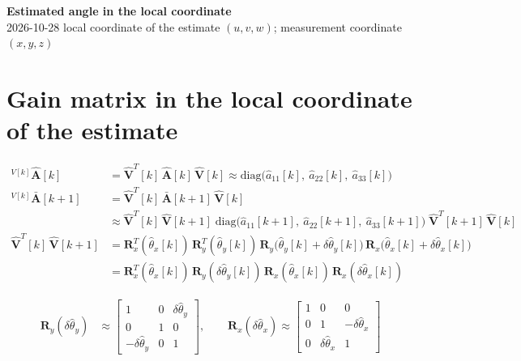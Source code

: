 \documentclass[11pt,a4paper]{ctexart}
\newcommand{\setline}[1]{\par\medskip\noindent{\small\textcolor[gray]{0.35}{#1}}}
\newcommand{\Ab}{\bar{\mathbf A}}
\newcommand{\Vh}{\hat{\mathbf V}}
\newcommand{\T}{T}
\newcommand{\dth}{\delta\hat\theta}
\begin{document}
\begin{center}\textbf{\large Estimated angle in the local coordinate}\\[2pt]
\small 2026-10-28 \quad local coordinate of the estimate $(u, v, w)$; measurement coordinate $(x, y, z)$\end{center}

\section{Gain matrix in the local coordinate of the estimate}
\begin{align*}
{}^{V[k]}\hat{\mathbf A}[k] &= \Vh^{\T}[k]\,\hat{\mathbf A}[k]\,\Vh[k] \approx \mathrm{diag}\big(\hat a_{11}[k],\ \hat a_{22}[k],\ \hat a_{33}[k]\big) \\[4pt]
{}^{V[k]}\Ab[k+1] &= \Vh^{\T}[k]\,\Ab[k+1]\,\Vh[k] \\
&\approx \Vh^{\T}[k]\,\Vh[k+1]\;\mathrm{diag}\big(\hat a_{11}[k+1],\ \hat a_{22}[k+1],\ \hat a_{33}[k+1]\big)\;\Vh^{\T}[k+1]\,\Vh[k] \\[4pt]
\Vh^{\T}[k]\,\Vh[k+1] &= \mathbf R_x^{\T}(\hat\theta_x[k])\,\mathbf R_y^{\T}(\hat\theta_y[k])\,\mathbf R_y\big(\hat\theta_y[k] + \dth_y[k]\big)\,\mathbf R_x\big(\hat\theta_x[k] + \dth_x[k]\big) \\
&= \mathbf R_x^{\T}(\hat\theta_x[k])\,\mathbf R_y(\dth_y[k])\,\mathbf R_x(\hat\theta_x[k])\,\mathbf R_x(\dth_x[k])
\end{align*}
\setline{small angle}
\begin{align*}
\mathbf R_y(\dth_y) &\approx \begin{bmatrix} 1 & 0 & \dth_y \\ 0 & 1 & 0 \\ -\dth_y & 0 & 1 \end{bmatrix}, \qquad
\mathbf R_x(\dth_x) \approx \begin{bmatrix} 1 & 0 & 0 \\ 0 & 1 & -\dth_x \\ 0 & \dth_x & 1 \end{bmatrix}
\end{align*}
\setline{product of two small angles left out}
\end{document}
